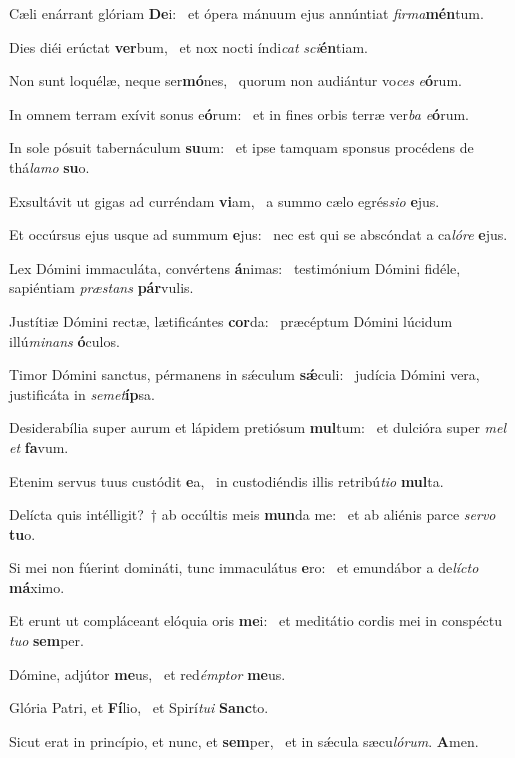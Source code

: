 \item Cæli enárrant glóriam \textbf{De}i:~\psstar{} et ópera mánuum ejus annúntiat \textit{firma}\textbf{mén}tum.
\item Dies diéi erúctat \textbf{ver}bum,~\psstar{} et nox nocti índi\textit{cat} \textit{sci}\textbf{én}tiam.
\item Non sunt loquélæ, neque ser\textbf{mó}nes,~\psstar{} quorum non audiántur vo\textit{ces} \textit{e}\textbf{ó}rum.
\item In omnem terram exívit sonus e\textbf{ó}rum:~\psstar{} et in fines orbis terræ ver\textit{ba} \textit{e}\textbf{ó}rum.
\item In sole pósuit tabernáculum \textbf{su}um:~\psstar{} et ipse tamquam sponsus procédens de thá\textit{lamo} \textbf{su}o.
\item Exsultávit ut gigas ad curréndam \textbf{vi}am,~\psstar{} a summo cælo egrés\textit{sio} \textbf{e}jus.
\item Et occúrsus ejus usque ad summum \textbf{e}jus:~\psstar{} nec est qui se abscóndat a ca\textit{lóre} \textbf{e}jus.
\item Lex Dómini immaculáta, convértens \textbf{á}nimas:~\psstar{} testimónium Dómini fidéle, sapiéntiam \textit{præstans} \textbf{pár}vulis.
\item Justítiæ Dómini rectæ, lætificántes \textbf{cor}da:~\psstar{} præcéptum Dómini lúcidum illú\textit{minans} \textbf{ó}culos.
\item Timor Dómini sanctus, pérmanens in sǽculum \textbf{sǽ}culi:~\psstar{} judícia Dómini vera, justificáta in \textit{semet}\textbf{íp}sa.
\item Desiderabília super aurum et lápidem pretiósum \textbf{mul}tum:~\psstar{} et dulcióra super \textit{mel} \textit{et} \textbf{fa}vum.
\item Etenim servus tuus custódit \textbf{e}a,~\psstar{} in custodiéndis illis retribú\textit{tio} \textbf{mul}ta.
\item Delícta quis intélligit?~† ab occúltis meis \textbf{mun}da me:~\psstar{} et ab aliénis parce \textit{servo} \textbf{tu}o.
\item Si mei non fúerint domináti, tunc immaculátus \textbf{e}ro:~\psstar{} et emundábor a de\textit{lícto} \textbf{má}ximo.
\item Et erunt ut compláceant elóquia oris \textbf{me}i:~\psstar{} et meditátio cordis mei in conspéctu \textit{tuo} \textbf{sem}per.
\item Dómine, adjútor \textbf{me}us,~\psstar{} et red\textit{émptor} \textbf{me}us.
\item Glória Patri, et \textbf{Fí}lio,~\psstar{} et Spirí\textit{tui} \textbf{Sanc}to.
\item Sicut erat in princípio, et nunc, et \textbf{sem}per,~\psstar{} et in sǽcula sæcu\textit{lórum}. \textbf{A}men.
